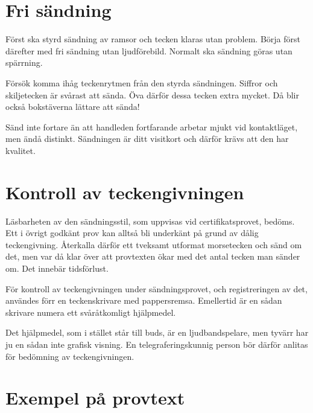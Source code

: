 \section{Fri sändning}

Först ska styrd sändning av ramsor och tecken klaras utan problem.
Börja först därefter med fri sändning utan ljudförebild.
Normalt ska sändning göras utan spärrning.

Försök komma ihåg teckenrytmen från den styrda sändningen.
Siffror och skiljetecken är svårast att sända.
Öva därför dessa tecken extra mycket.
Då blir också bokstäverna lättare att sända!

Sänd inte fortare än att handleden fortfarande arbetar mjukt vid kontaktläget,
men ändå distinkt.
Sändningen är ditt visitkort och därför krävs att den har kvalitet.


\section[Teckengivning]{Kontroll av teckengivningen}

Läsbarheten av den sändningsstil, som uppvisas vid certifikatsprovet, bedöms.
Ett i övrigt godkänt prov kan alltså bli underkänt på grund av dålig
teckengivning.
Återkalla därför ett tveksamt utformat morsetecken och sänd om det, men var då
klar över att provtexten ökar med det antal tecken man sänder om.
Det innebär tidsförlust.

För kontroll av teckengivningen under sändningsprovet, och registreringen av
det, användes förr en teckenskrivare med pappersremsa.
Emellertid är en sådan skrivare numera ett svåråtkomligt hjälpmedel.

Det hjälpmedel, som i stället står till buds, är en ljudbandspelare, men tyvärr
har ju en sådan inte grafisk visning.
En telegraferingskunnig person bör därför anlitas för bedömning av
teckengivningen.

\section[Provtext]{Exempel på provtext}

